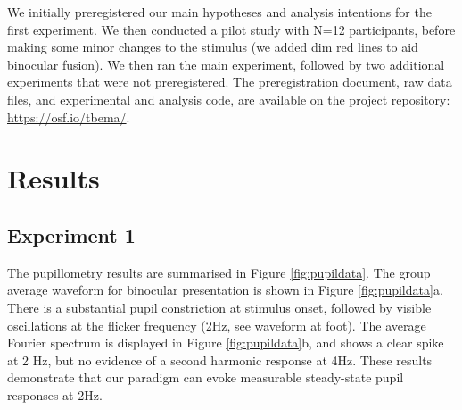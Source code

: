 \documentclass[
]{article}
\begin{document}
We initially preregistered our main hypotheses and analysis intentions for the first experiment. We then conducted a pilot study with N=12 participants, before making some minor changes to the stimulus (we added dim red lines to aid binocular fusion). We then ran the main experiment, followed by two additional experiments that were not preregistered. The preregistration document, raw data files, and experimental and analysis code, are available on the project repository: \url{https://osf.io/tbema/}.

\hypertarget{results}{%
\section{Results}\label{results}}

\hypertarget{experiment-1}{%
\subsection{Experiment 1}\label{experiment-1}}

The pupillometry results are summarised in Figure \ref{fig:pupildata}. The group average waveform for binocular presentation is shown in Figure \ref{fig:pupildata}a. There is a substantial pupil constriction at stimulus onset, followed by visible oscillations at the flicker frequency (2Hz, see waveform at foot). The average Fourier spectrum is displayed in Figure \ref{fig:pupildata}b, and shows a clear spike at 2 Hz, but no evidence of a second harmonic response at 4Hz. These results demonstrate that our paradigm can evoke measurable steady-state pupil responses at 2Hz.
\end{document}

